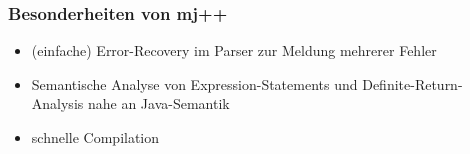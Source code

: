 \begin{frame}
    \frametitle{Besonderheiten von mj++}
    \begin{itemize}
        \item (einfache) Error-Recovery im Parser zur Meldung mehrerer Fehler
        \item Semantische Analyse von Expression-Statements und Definite-Return-Analysis nahe an Java-Semantik
        \item schnelle Compilation
    \end{itemize}
\end{frame}
